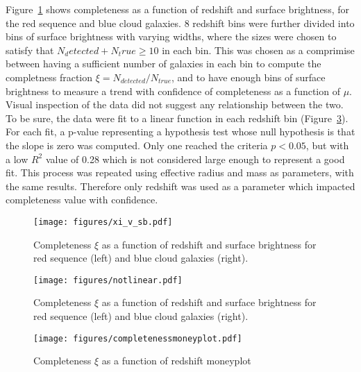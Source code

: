 Figure~\ref{fig:xi_v_sb} shows completeness as a function of redshift and surface brightness, for the red sequence and blue cloud galaxies. 8 redshift bins were further divided into bins of surface brightness with varying widths, where the sizes were chosen to satisfy that $N_detected + N_true \ge 10$ in each bin. This was chosen as a comprimise between having a sufficient number of galaxies in each bin to compute the completness fraction $\xi = N_{detected}/N_{true}$, and to have enough bins of surface brightness to measure a trend with confidence of completeness as a function of $\mu$. Visual inspection of the data did not suggest any relationship between the two. To be sure, the data were fit to a linear function in each redshift bin (Figure~\ref{fig:notlinear}). For each fit, a p-value representing a hypothesis test whose null hypothesis is that the slope is zero was computed. Only one reached the criteria $p<0.05$, but with a low $R^{2}$ value of 0.28 which is not considered large enough to represent a good fit. This process was repeated using effective radius and mass as parameters, with the same results. Therefore only redshift was used as a parameter which impacted completeness value with confidence.  


\begin{figure}
\centering
\texttt{[image: figures/xi\_v\_sb.pdf]}
\caption{Completeness $\xi$ as a function of redshift and surface brightness for red sequence (left) and blue cloud galaxies (right).}
\label{fig:xi_v_sb}
\end{figure}

\begin{figure}
\centering
\texttt{[image: figures/notlinear.pdf]}
\caption{Completeness $\xi$ as a function of redshift and surface brightness for red sequence (left) and blue cloud galaxies (right).}
\label{fig:notlinear}
\end{figure}


\begin{figure}
\centering
\texttt{[image: figures/completenessmoneyplot.pdf]}
\caption{Completeness $\xi$ as a function of redshift moneyplot}
\label{fig:notlinear}
\end{figure}


 
